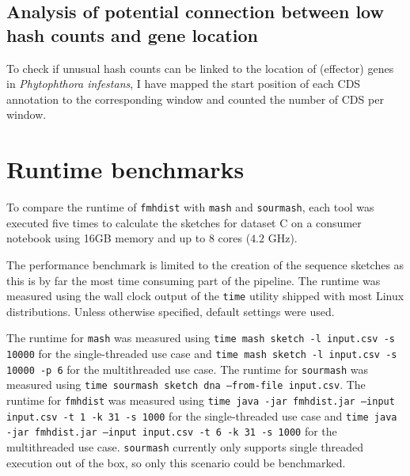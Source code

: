 \subsection*{Analysis of potential connection between low hash counts and gene location}
To check if unusual hash counts can be linked to the location of (effector)
genes in \textit{Phytophthora infestans}, I have mapped the start position of
each CDS annotation to the corresponding window and counted the number of CDS
per window.

\section{Runtime benchmarks}
To compare the runtime of \texttt{fmhdist} with \texttt{mash} and
\texttt{sourmash}, each tool was executed five times to calculate the sketches
for dataset C on a consumer notebook using 16GB memory and up to 8 cores ($4.2$
GHz).

The performance benchmark is limited to the creation of the sequence sketches
as this is by far the most time consuming part of the pipeline. The runtime was
measured using the wall clock output of the \texttt{time} utility shipped with
most Linux distributions. Unless otherwise specified, default settings were
used. 

The runtime for \texttt{mash} was measured using \texttt{time mash sketch -l
input.csv -s 10000} for the single-threaded use case and \texttt{time mash
sketch -l input.csv -s 10000 -p 6} for the multithreaded use case. The runtime
for \texttt{sourmash} was measured using \texttt{time sourmash sketch dna
--from-file input.csv}. The runtime for \texttt{fmhdist} was measured using
\texttt{time java -jar fmhdist.jar --input input.csv -t 1 -k 31 -s 1000} for the
single-threaded use case and \texttt{time java -jar fmhdist.jar --input
input.csv -t 6 -k 31 -s 1000} for the multithreaded use case. \texttt{sourmash}
currently only supports single threaded execution out of the box, so only this
scenario could be benchmarked.
